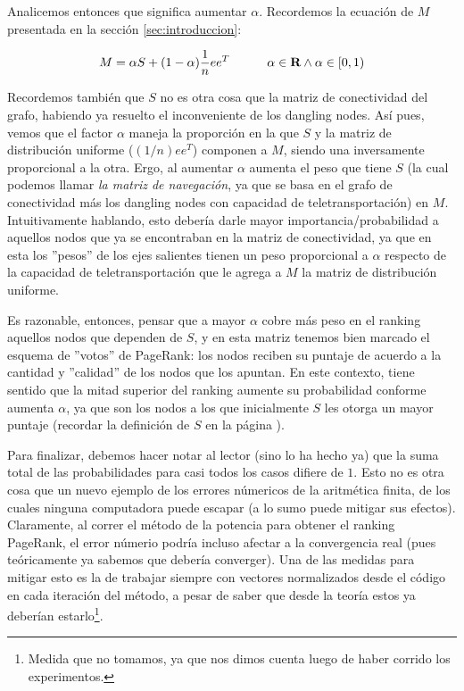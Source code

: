 \par Analicemos entonces que significa aumentar $\alpha$. Recordemos la
ecuaci\'on de $M$ presentada en la secci\'on \ref{sec:introduccion}:

\begin{equation*}
    M = \alpha S + (1-\alpha) \frac{1}{n}ee^T \quad\quad\quad \alpha\in\real
    \land \alpha\in\left[0,1\right) \label{eq:M_def}
\end{equation*}

\par Recordemos tambi\'en que $S$ no es otra cosa que la matriz de conectividad
del grafo, habiendo ya resuelto el inconveniente de los dangling nodes. As\'i
pues, vemos que el factor $\alpha$ maneja la proporci\'on en la que $S$ y la
matriz de distribuci\'on uniforme ($(1/n)ee^T$) componen a $M$, siendo una
inversamente proporcional a la otra. Ergo, al aumentar $\alpha$ aumenta el peso
que tiene $S$ (la cual podemos llamar \emph{la matriz de navegaci\'on}, ya que
se basa en el grafo de conectividad m\'as los dangling nodes con capacidad de
teletransportaci\'on) en $M$. Intuitivamente hablando, esto deber\'ia darle
mayor importancia/probabilidad a aquellos nodos que ya se encontraban en la
matriz de conectividad, ya que en esta los ''pesos'' de los ejes salientes
tienen un peso proporcional a $\alpha$ respecto de la capacidad de
teletransportaci\'on que le agrega a $M$ la matriz de distribuci\'on uniforme.

\par Es razonable, entonces, pensar que a mayor $\alpha$ cobre m\'as peso en el
ranking aquellos nodos que dependen de $S$, y en esta matriz tenemos bien
marcado el esquema de ''votos'' de PageRank: los nodos reciben su puntaje de
acuerdo a la cantidad y ''calidad'' de los nodos que los apuntan. En este
contexto, tiene sentido que la mitad superior del ranking aumente su
probabilidad conforme aumenta $\alpha$, ya que son los nodos a los que
inicialmente $S$ les otorga un mayor puntaje (recordar la definici\'on de $S$ en
la p\'agina \pageref{eq:S}).

\par Para finalizar, debemos hacer notar al lector (sino lo ha hecho ya) que la
suma total de las probabilidades para casi todos los casos difiere de $1$. Esto
no es otra cosa que un nuevo ejemplo de los errores n\'umericos de la
aritm\'etica finita, de los cuales ninguna computadora puede escapar (a lo sumo
puede mitigar sus efectos). Claramente, al correr el m\'etodo de la potencia
para obtener el ranking PageRank, el error n\'umerio podr\'ia incluso afectar a
la convergencia real (pues te\'oricamente ya sabemos que deber\'ia converger).
Una de las medidas para mitigar esto es la de trabajar siempre con vectores
normalizados desde el c\'odigo en cada iteraci\'on del m\'etodo, a pesar de
saber que desde la teor\'ia estos ya deber\'ian estarlo\footnote{Medida que no
tomamos, ya que nos dimos cuenta luego de haber corrido los experimentos.}.

